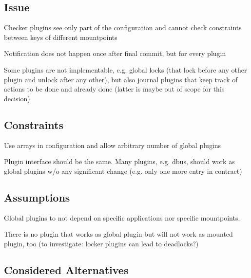 \subsection*{Issue}


\begin{DoxyItemize}
\item Checker plugins see only part of the configuration and cannot check constraints between keys of different mountpoints
\item Notification does not happen once after final commit, but for every plugin
\item Some plugins are not implementable, e.\+g. global locks (that lock before any other plugin and unlock after any other), but also journal plugins that keep track of actions to be done and already done (latter is maybe out of scope for this decision)
\end{DoxyItemize}

\subsection*{Constraints}


\begin{DoxyItemize}
\item Use arrays in configuration and allow arbitrary number of global plugins
\item Plugin interface should be the same. Many plugins, e.\+g. dbus, should work as global plugins w/o any significant change (e.\+g. only one more entry in contract)
\end{DoxyItemize}

\subsection*{Assumptions}


\begin{DoxyItemize}
\item Global plugins to not depend on specific applications nor specific mountpoints.
\item There is no plugin that works as global plugin but will not work as mounted plugin, too (to investigate\+: locker plugins can lead to deadlocks?)
\end{DoxyItemize}

\subsection*{Considered Alternatives}


